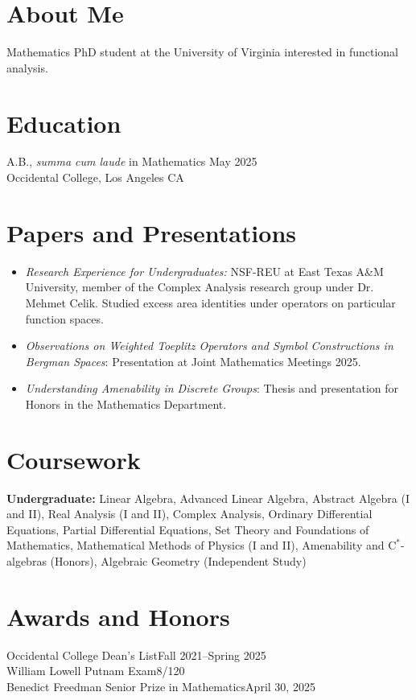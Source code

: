 \documentclass[margin, 12pt]{res} %
\begin{document}
\begin{resume}

\section{\sc About Me}
Mathematics PhD student at the University of Virginia interested in functional analysis.

\section{\sc Education}

A.B., \textsl{summa cum laude} in Mathematics \hfill May 2025 \\
Occidental College, Los Angeles CA
\section{\sc Papers and Presentations}
\begin{itemize}
  \item {\sl Research Experience for Undergraduates:} NSF-REU at East Texas A\&M University, member of the Complex Analysis research group under Dr. Mehmet Celik. Studied excess area identities under operators on particular function spaces.
  \item {\sl Observations on Weighted Toeplitz Operators and Symbol Constructions in Bergman Spaces}: Presentation at Joint Mathematics Meetings 2025.
  \item {\sl Understanding Amenability in Discrete Groups}: Thesis and presentation for Honors in the Mathematics Department.
\end{itemize}
\section{\sc Coursework}
\textbf{Undergraduate:} Linear Algebra, Advanced Linear Algebra, Abstract Algebra (I and II), Real Analysis (I and II), Complex Analysis, Ordinary Differential Equations, Partial Differential Equations, Set Theory and Foundations of Mathematics, Mathematical Methods of Physics (I and II), Amenability and $\mathrm{C}^{\ast}$-algebras (Honors), Algebraic Geometry (Independent Study)
\section{\sc Awards and Honors}
Occidental College Dean's List\hfill Fall 2021--Spring 2025\\
William Lowell Putnam Exam\hfill 8/120\\
Benedict Freedman Senior Prize in Mathematics\hfill April 30, 2025
\end{resume}
\end{document}
